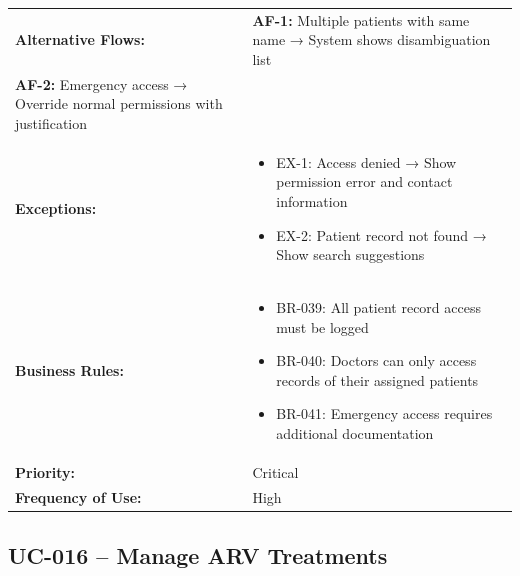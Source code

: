 \documentclass[12pt,a4paper]{article}
\begin{document}
\begin{longtable}{|p{4.5cm}|p{10.5cm}|}
\hline
\textbf{Alternative Flows:} &
\textbf{AF-1:} Multiple patients with same name → System shows disambiguation list \\
\textbf{AF-2:} Emergency access → Override normal permissions with justification \\
\hline
\textbf{Exceptions:} &
\begin{itemize}
  \item EX-1: Access denied → Show permission error and contact information
  \item EX-2: Patient record not found → Show search suggestions
\end{itemize} \\
\hline
\textbf{Business Rules:} &
\begin{itemize}
  \item BR-039: All patient record access must be logged
  \item BR-040: Doctors can only access records of their assigned patients
  \item BR-041: Emergency access requires additional documentation
\end{itemize} \\
\hline
\textbf{Priority:} & Critical \\
\hline
\textbf{Frequency of Use:} & High \\
\hline
\end{longtable}

\subsection{UC-016 – Manage ARV Treatments}
\end{document}
